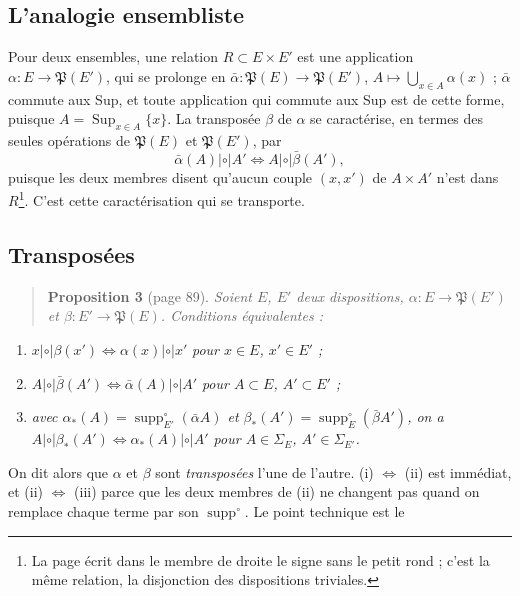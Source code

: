 \documentclass[11pt,a4paper]{article}
\begin{document}
\subsection*{L'analogie ensembliste}

Pour deux ensembles, une relation $R \subset E \times E'$ est une application
$\alpha : E \to \mathfrak{P}(E')$, qui se prolonge en $\bar\alpha :
\mathfrak{P}(E) \to \mathfrak{P}(E')$, $A \mapsto \bigcup_{x \in A}\alpha(x)$ ;
$\bar\alpha$ commute aux Sup, et toute application qui commute aux Sup est de
cette forme, puisque $A = \operatorname{Sup}_{x \in A}\{x\}$. La transposée
$\beta$ de $\alpha$ se caractérise, en termes des seules opérations de
$\mathfrak{P}(E)$ et $\mathfrak{P}(E')$, par
\[
\bar\alpha(A) \mathrel{|\circ|} A' \iff A \mathrel{|\circ|} \bar\beta(A'),
\]
puisque les deux membres disent qu'aucun couple $(x, x')$ de $A \times A'$ n'est
dans $R$\footnote{La page écrit dans le membre de droite le signe sans le petit
rond ; c'est la même relation, la disjonction des dispositions triviales.}. C'est
cette caractérisation qui se transporte.

\subsection*{Transposées}

\begin{quote}
\textbf{Proposition 3} (page 89). \emph{Soient $E$, $E'$ deux dispositions,
$\alpha : E \to \mathfrak{P}(E')$ et $\beta : E' \to \mathfrak{P}(E)$. Conditions
équivalentes :}
\end{quote}
\begin{enumerate}
\item[(i)] $x \mathrel{|\circ|} \beta(x') \iff \alpha(x) \mathrel{|\circ|} x'$
\emph{pour $x \in E$, $x' \in E'$ ;}
\item[(ii)] $A \mathrel{|\circ|} \bar\beta(A') \iff \bar\alpha(A)
\mathrel{|\circ|} A'$ \emph{pour $A \subset E$, $A' \subset E'$ ;}
\item[(iii)] \emph{avec $\alpha_{*}(A) = \operatorname{supp}^{\circ}_{E'}(\bar\alpha
A)$ et $\beta_{*}(A') = \operatorname{supp}^{\circ}_{E}(\bar\beta A')$, on a $A
\mathrel{|\circ|} \beta_{*}(A') \iff \alpha_{*}(A) \mathrel{|\circ|} A'$ pour $A
\in \Sigma_{E}$, $A' \in \Sigma_{E'}$.}
\end{enumerate}

On dit alors que $\alpha$ et $\beta$ sont \emph{transposées} l'une de l'autre.
(i) $\iff$ (ii) est immédiat, et (ii) $\iff$ (iii) parce que les deux membres de
(ii) ne changent pas quand on remplace chaque terme par son
$\operatorname{supp}^{\circ}$. Le point technique est le
\end{document}
